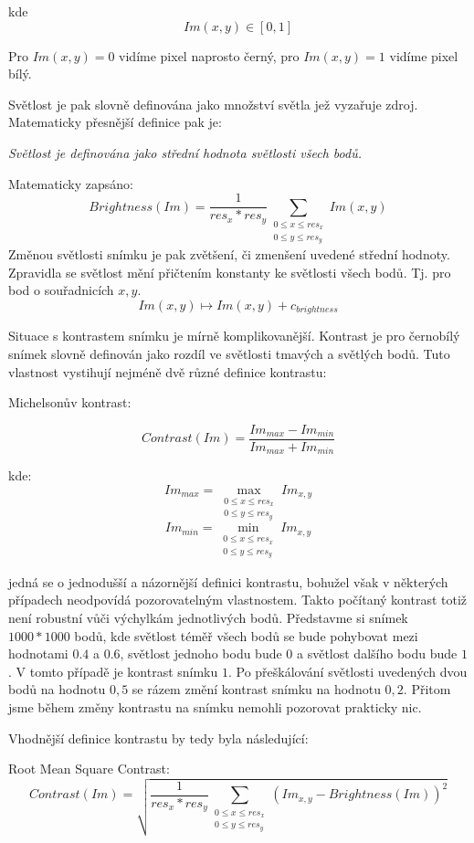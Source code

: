 kde \[ Im(x,y) \in [0,1] \]

Pro $ Im(x,y) = 0 $ vidíme pixel naprosto černý, pro $ Im(x,y) = 1 $ vidíme pixel bílý.

Světlost je pak slovně definována jako množství světla jež vyzařuje zdroj. Matematicky přesnější definice pak je:

\emph{Světlost je definována jako střední hodnota světlosti všech bodů.}

Matematicky zapsáno:
\[
  Brightness(Im) = \frac{1}{res_{x}*res_{y}}\sum_{\substack{0 \leq x \leq res_{x} \\ 0 \leq y \leq res_{y}}} Im(x,y)
\]
Změnou světlosti snímku je pak zvětšení, či zmenšení uvedené střední hodnoty. Zpravidla se světlost mění přičtením konstanty ke světlosti všech bodů. Tj. pro bod o souřadnicích $x,y$.
\[
Im(x,y) \longmapsto Im(x,y) + c_{brightness}
\]

Situace s kontrastem snímku je mírně komplikovanější. Kontrast je pro černobílý snímek slovně definován jako rozdíl ve světlosti tmavých a světlých bodů. Tuto vlastnost vystihují nejméně dvě různé definice kontrastu:

Michelsonův kontrast:

\[
Contrast(Im) = \frac{Im_{max}-Im_{min}}{Im_{max}+Im_{min}}
\]

kde:
\[
Im_{max} = \max_{\substack{ 0 \leq x \leq res_{x} \\ 0 \leq y \leq res_{y} }}{Im_{x,y}} 
\]
\[
Im_{min} = \min_{\substack{ 0 \leq x \leq res_{x} \\ 0 \leq y \leq res_{y} }}{Im_{x,y}}
\]

jedná se o jednodušší a názornější definici kontrastu, bohužel však v některých případech neodpovídá pozorovatelným vlastnostem. Takto počítaný kontrast totiž není robustní vůči výchylkám jednotlivých bodů. Představme si snímek $1000*1000$ bodů, kde světlost téměř všech bodů se bude pohybovat mezi hodnotami $0.4$ a $0.6$, světlost jednoho bodu bude $0$ a světlost dalšího bodu bude $1$. V tomto případě je kontrast snímku $1$. Po přeškálování světlosti uvedených dvou bodů na hodnotu $0,5$ se rázem změní kontrast snímku na hodnotu $0,2$. Přitom jsme během změny kontrastu na snímku nemohli pozorovat prakticky nic.

Vhodnější definice kontrastu by tedy byla následující:

Root Mean Square Contrast:
\[
Contrast(Im) = \sqrt{\frac{1}{res_{x}*res_{y}}\sum_{\substack{ 0 \leq x \leq res_{x} \\ 0 \leq y \leq res_{y} }}(Im_{x,y}-Brightness(Im))^2}
\]

